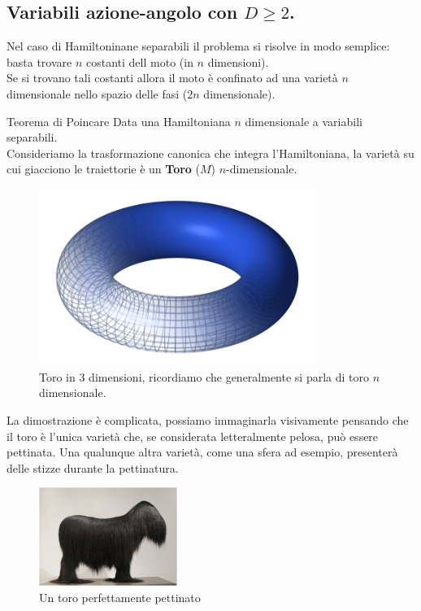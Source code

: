 \subsection{Variabili azione-angolo con $D\ge 2$.}%
\label{sub:Variabili azione angolo in dimensioni >2.}
Nel caso di Hamiltoninane separabili il problema si risolve in modo semplice: basta trovare $n$ costanti dell moto (in $n$ dimensioni).\\
Se si trovano tali costanti allora il moto è confinato ad una varietà $n$ dimensionale nello spazio delle fasi ($2n$ dimensionale).
\begin{redbox}{Teorema di Poincare}
    Data una Hamiltoniana $n$ dimensionale a variabili separabili.\\
    Consideriamo la trasformazione canonica che integra l'Hamiltoniana, la varietà su cui giacciono le traiettorie è un \textbf{Toro} ($M$) $n$-dimensionale.
\begin{figure}[H]
    \centering
    \includegraphics[width=0.8\textwidth]{figures/lez_16_Torus_low_quality.png}
    \caption{\scriptsize Toro in 3 dimensioni, ricordiamo che generalmente si parla di toro $n$ dimensionale.}
    \label{fig:figures-lez_16_Torus_low_quality-png}
\end{figure}
\noindent
\end{redbox}
\noindent
La dimostrazione è complicata, possiamo immaginarla visivamente pensando che il toro è l'unica varietà che, se considerata letteralmente pelosa, può essere pettinata. Una qualunque altra varietà, come una sfera ad esempio, presenterà delle stizze durante la pettinatura.
\begin{figure}[H]
    \centering
    \includegraphics[width=0.4\textwidth]{figures/lez_15_toro_peloso.jpg}
    \caption{\scriptsize Un toro perfettamente pettinato}
    \label{fig:figures-lez_15_toro_peloso-jpg}
\end{figure}
